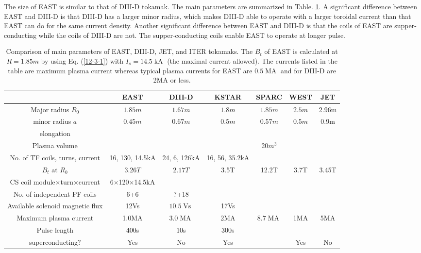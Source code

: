 \documentclass{llncs}
\newcommand{\tmop}[1]{\ensuremath{\operatorname{#1}}}
\begin{document}
The size of EAST is similar to that of DIII-D tokamak. The main parameters are
summarized in Table. \ref{12-3-2}. A significant difference between EAST and
DIII-D is that DIII-D has a larger minor radius, which makes DIII-D able to
operate with a larger toroidal current than that EAST can do for the same
current density. Another significant difference between EAST and DIII-D is
that the coils of EAST are supper-conducting while the coils of DIII-D are
not. The supper-conducting coils enable EAST to operate at longer pulse.

\begin{table}[h]
  \begin{tabular}{|c|c|c|c|c|c|c|}
    \hline
    & EAST & DIII-D{\cite{Luxon2002}} & KSTAR{\cite{Lee2001}} & SPARC & WEST
    & JET\\
    \hline
    Major radius $R_0$ & $1.85 m$ & $1.67 m$ & $1.8 m$ & $1.85 m$ & $2.5 m$ &
    2.96m\\
    \hline
    minor radius $a$  & $0.45 m$ & $0.67 m$ & $0.5 m$ & $0.57 m$ & $0.5 m$ &
    0.9m\\
    \hline
    elongation &  &  &  &  &  & \\
    \hline
    Plasma volume &  &  &  & 20$m^3$ &  & \\
    \hline
    No. of TF coils, turns, current & 16, 130, 14.5kA & 24, 6, 126kA & 16, 56,
    35.2kA &  &  & \\
    \hline
    $B_t$ at $R_0$ & $3.26 T$ & $2.17 T$ & 3.5T & 12.2T & 3.7T & 3.45T\\
    \hline
    CS coil module$\times$turn$\times$current & 6$\times$120$\times$14.5kA & 
    &  &  &  & \\
    \hline
    No. of independent PF coils & 6+6 & ?+18 &  &  &  & \\
    \hline
    Available solenoid magnetic flux & 12Vs & $10.5 \tmop{Vs}$ & 17Vs &  &  &
    \\
    \hline
    Maximum plasma current & 1.0MA & $3.0 \tmop{MA}$ & 2MA & $8.7 \tmop{MA}$ &
    1MA & 5MA\\
    \hline
    Pulse length & 400s & 10s & 300s &  &  & \\
    \hline
    superconducting? & Yes & No & Yes &  & Yes & No\\
    \hline
  \end{tabular}
  
  \
  \caption{\label{12-3-2}Comparison of main parameters of EAST, DIII-D, JET,
  and ITER tokamaks. The $B_t$ of EAST is calculated at $R = 1.85 m$ by using
  Eq. (\ref{12-3-1}) with $I_s = 14.5 \tmop{kA}$ (the maximal current
  allowed). The currents listed in the table are maximum plasma current
  whereas typical plasma currents for EAST are $0.5 \tmop{MA}$ and for DIII-D
  are 2MA or less.}
\end{table}
\end{document}
